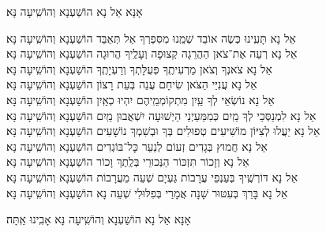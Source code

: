\documentclass[twoside, openany, parskip=half, 11pt]{book}
\begin{document}
\begin{large}אָנָּא אֵל נָא הוֹשַׁעְנָא וְהוֹשִֽׁיעָה נָּא׃\end{large}

\begin{small}
אֵל נָא תָּעִֽינוּ כְּשֶׂה אוֹבֵד שְׁמֵֽנוּ מִסִּפְרְךָ אַל תְּאַבֵּד \hfill הוֹשַׁעְנָא וְהוֹשִֽׁיעָה נָּא׃ \\
אֵל נָא רְעֵה אֶת־צֹאן הַהֲרֵגָה קְצוּפָה וְעָלֶֽיךָ הֲרוּגָה \hfill הוֹשַׁעְנָא וְהוֹשִֽׁיעָה נָּא׃\\
אֵל נָא צֹאנְךָ וְצֹאן מַרְעִיתֶֽךָ פְּעֻלָּתְךָ וְרַעְיָתֶֽךָ \hfill הוֹשַׁעְנָא וְהוֹשִֽׁיעָה נָּא׃\\
אֵל נָא עֲנִיֵּי הַצֹּאן שִׂיחָם עֲנֵה בְּעֵת רָצוֹן \hfill הוֹשַׁעְנָא וְהוֹשִֽׁיעָה נָּא׃\\
אֵל נָא נוֹשְׂאֵי לְךָ עַֽיִן מִתְקוֹמְמֵֽיהֶם יִהְיוּ כְאַֽיִן \hfill הוֹשַׁעְנָא וְהוֹשִֽׁיעָה נָּא׃\\
אֵל נָא לִמְנַסְּכֵי לְךָ מַֽיִם כְּמִמַּעַיְנֵי הַיְשׁוּעָה יִשְׁאֲבוּן מַֽיִם \hfill הוֹשַׁעְנָא וְהוֹשִֽׁיעָה נָּא׃\\
אֵל נָא יַעֲלוּ לְצִיּוֹן מוֹשִׁיעִים טְפוּלִים בְּךָ וּבְשִׁמְךָ נוֹשָׁעִים \hfill הוֹשַׁעְנָא וְהוֹשִֽׁיעָה נָּא׃\\
אֵל נָא חֲמוּץ בְּגָדִים זְעוֹם לְנַעֵר כׇּל־בּוֹגְדִים \hfill הוֹשַׁעְנָא וְהוֹשִֽׁיעָה נָּא׃\\
אֵל נָא וְזָכוֹר תִּזְכּוֹר הַנְּכוּרֵי בְּלֶֽתֶךְ וָכוֹר \hfill הוֹשַׁעְנָא וְהוֹשִֽׁיעָה נָּא׃\\
אֵל נָא דּוֹרְשֶֽׁיךָ בְּעַנְפֵי עֲרָבוֹת גַּעְיָם שְׁעֵה מֵעֲרָבוֹת \hfill הוֹשַׁעְנָא וְהוֹשִֽׁיעָה נָּא׃\\
אֵל נָא בָּרֵךְ בְּעִטּוּר שָׁנָה אֲמָרַי בְּפִלּוּלִי שְׁעֵה נָא \hfill הוֹשַׁעְנָא וְהוֹשִֽׁיעָה נָּא׃

\end{small}

\begin{large}אָנָּא אֵל נָא הוֹשַׁעְנָא וְהוֹשִֽׁיעָה נָּא אָבִֽינוּ אַֽתָּה׃\end{large}
\end{document}
